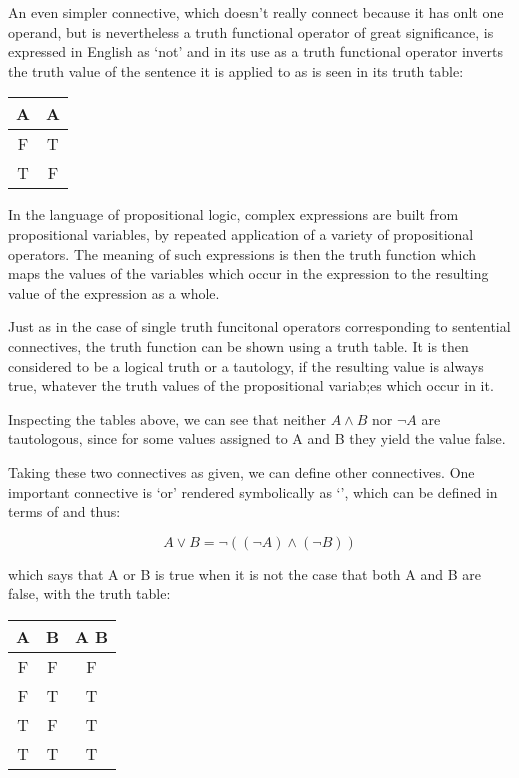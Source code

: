 \documentclass[10pt,titlepage]{article}
\begin{document}
An even simpler connective, which doesn't really connect because it has onlt one operand, but is nevertheless a truth functional operator of great significance, is expressed in English as `not' and in its use as a truth functional operator inverts the truth value of the sentence it is applied to as is seen in its truth table:


\begin{center}
  \begin{tabular}{c|c}
 A &\lnot{} A\\
 \hline
 F & T\\
 T & F\\
 \end{tabular}
\end{center}


In the language of propositional logic, complex expressions are built from propositional variables, by repeated application of a variety of propositional operators.
The meaning of such expressions is then the truth function which maps the values of the variables which occur in the expression to the resulting value of the expression as a whole.

Just as in the case of single truth funcitonal operators corresponding to sentential connectives, the truth function can be shown using a truth table.
It is then considered to be a logical truth or a tautology, if the resulting value is always true, whatever the truth values of the propositional variab;es which occur in it.

Inspecting the tables above, we can see that neither $A \land B$ nor $\lnot A$ are tautologous, since for some values assigned to A and B they yield the value false.

Taking these two connectives as given, we can define other connectives.
One important connective is `or' rendered symbolically as `\lor{}', which can be defined in terms of \land{} and \lor thus:

\[  A \lor{} B = \lnot{} ((\lnot{} A) \land{} (\lnot{} B)) \]

which says that A or B is true when it is not the case that both A and B are false, with the truth table:

\begin{center}
  \begin{tabular}{c|c|c}
 A & B & A \lor{} B\\
 \hline
 F & F & F\\
 F & T & T\\
 T & F & T\\
 T & T & T\\
 \end{tabular}
\end{center}
\end{document}
